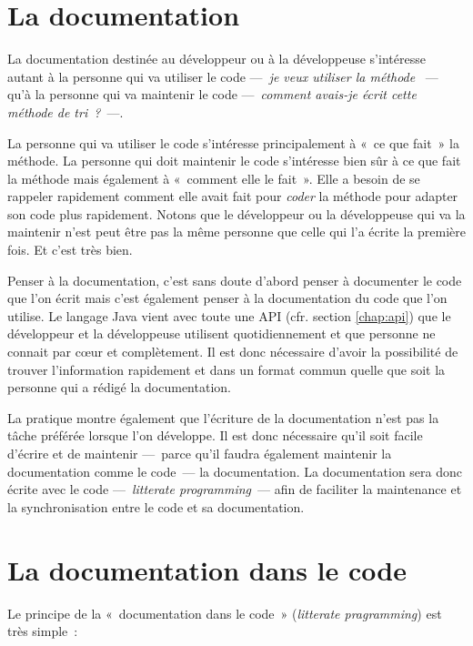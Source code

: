 \minitoc

\section{La documentation}

La documentation destinée au développeur ou à la développeuse s'intéresse
autant à la personne qui va utiliser le code —~\textit{je veux utiliser la
méthode }~— qu'à la personne qui va maintenir le code
—~\textit{comment avais-je écrit cette méthode de tri~?}~—. 

La personne qui va utiliser le code s'intéresse principalement à «~ce que
fait~» la méthode. La personne qui doit maintenir le code s'intéresse bien sûr
à ce que fait la méthode mais également à «~comment elle le fait~». Elle
a besoin de se rappeler rapidement comment elle avait fait pour \textit{coder}
la méthode pour adapter son code plus rapidement. Notons que le développeur ou
la développeuse qui va la maintenir n'est peut être pas la même personne que celle
qui l'a écrite la première fois. Et c'est très bien.  

 Penser à la documentation, c'est sans doute d'abord penser
à documenter le code que l'on écrit mais c'est également penser à la
documentation du code que l'on utilise. Le langage Java vient avec toute une
API (cfr. section \vref{chap:api}) que le développeur et la développeuse
utilisent quotidiennement et que personne ne connait par cœur et complètement.
Il est donc nécessaire d'avoir la possibilité de trouver l'information
rapidement et dans un format commun quelle que soit la personne qui a rédigé
la documentation.     

La pratique montre également que l'écriture de la documentation n'est pas la
tâche préférée lorsque l'on développe. Il est donc nécessaire qu'il soit facile
d'écrire et de maintenir —~parce qu'il faudra également maintenir la
documentation comme le code~— la documentation. La documentation sera donc
écrite avec le code —~\textit{litterate programming}~— afin de faciliter la
maintenance et la synchronisation entre le code et sa documentation.  


\section{La documentation dans le code}

Le principe de la «~documentation dans le code~» (\textit{litterate pragramming}) est très simple~:

